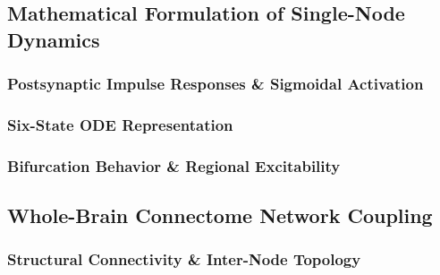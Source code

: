 \documentclass[
    english,
	ruledheaders=section,%
	class=report,%
	thesis={type=master},%
	accentcolor=2c, %
	custommargins=false,
	marginpar=false,
	BCOR=10mm, %
	parskip=half-, %
	fontsize=11pt, %
  	twoside,
  	numbers=noendperiod,
  	fleqn,
  	captions=oneline, %
	captions=tableheading, %
  	IMRAD=false
]{tudapub}
\begin{document}
\subsection{Mathematical Formulation of Single-Node Dynamics}

\subsubsection{Postsynaptic Impulse Responses \& Sigmoidal Activation}

\subsubsection{Six-State ODE Representation}

\subsubsection{Bifurcation Behavior \& Regional Excitability}

\subsection{Whole-Brain Connectome Network Coupling}

\subsubsection{Structural Connectivity \& Inter-Node Topology}
\end{document}
